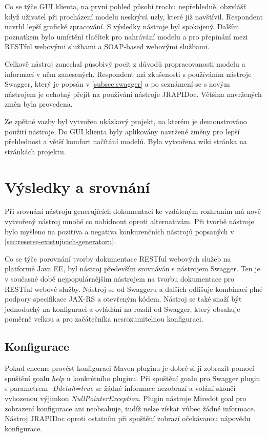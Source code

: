 \documentclass[11pt,twoside,a4paper]{book}
\begin{document}
Co se týče GUI klienta, na první pohled působí trochu nepřehledně, obzvlášť když
uživatel při procházení modelu neskrývá uzly, které již navštívil. Respondent
navrhl lepší grafické zpracování. S výsledky nástroje byl spokojený.
Dalším poznatkem bylo umístění tlačítek pro nahrávání modelu a pro přepínání
mezi RESTful webovými službami a SOAP-based webovými službami.

Celkově nástroj zanechal působivý pocit z důvodů propracovanosti modelu a informací v něm
zanesených. Respondent má zkušenosti s používáním nástroje Swagger, který je
popsán v \ref{subsec:swagger} a po seznámení se s novým nástrojem je ochotný přejít na
používání nástroje JRAPIDoc. Většina navržených změn byla provedena.

Ze zpětné vazby byl vytvořen ukázkový projekt, na kterém je demonstrováno použití nástroje.
Do GUI klienta byly aplikovány navržené změny pro lepší přehlednost a větší komfort
načítání modelů. Byla vytvořena wiki stránka na stránkách projektu.

\chapter{Výsledky a srovnání}
\label{ch:vysledky-a-srovnani}

Při srovnání nástrojů generujících dokumentaci ke vzdáleným rozhraním má nově
vytvořený nástroj mnohé co nabídnout oproti alternativám. Při tvorbě nástroje
bylo myšleno na pozitiva a negativa konkurenčních nástrojů popsaných v
\ref{sec:reserse-existujicich-generatoru}.

Co se týče porovnání tvorby dokumentace RESTful webových služeb na platformě
Java EE, byl nástroj především srovnáván s nástrojem Swagger. Ten je v současné
době nejpopulárnějším nástrojem na tvorbu dokumentace pro RESTful webové služby.
Nástroj se od Swaggeru a dalších odlišuje kombinací plné podpory specifikace
JAX-RS a otevřeným kódem. Nástroj se také snaží být jednoduchý na konfiguraci a
ovládání na rozdíl od Swagger, který obsahuje poměrně velkou a pro začátečníka
nesrozumitelnou konfiguraci.

\section{Konfigurace}

Pokud chceme provést konfiguraci Maven pluginu je dobré si ji zobrazit pomocí
spuštění goalu {\em help} u konkrétního pluginu. Při spuštění goalu pro Swagger
plugin s parametrem {\em -Ddetail=true} se žádné informace nezobrazí a volání
skončí vyhozenou výjimkou {\em NullPointerException}. Plugin nástroje Miredot
goal pro zobrazení konfigurace ani neobsahuje, tudíž nelze získat vůbec žádné
informace. Nástroj JRAPIDoc oproti ostatním při spuštění zobrazí očekávanou
nápovědu konfigurace.
\end{document}
